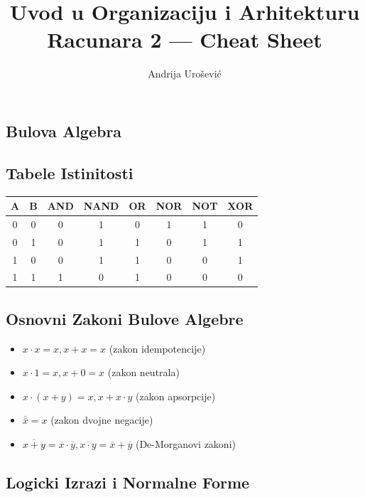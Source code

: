\documentclass[12p,a4paper]{article}
\title{Uvod u Organizaciju i Arhitekturu Racunara 2 --- Cheat Sheet}
\author{Andrija Urošević}
\begin{document}
\maketitle

\begin{multicols}{2}

\section{Bulova Algebra}

    \subsection{Tabele Istinitosti}

    \begin{tabular}{*{8}{c}}
        A & B & AND & NAND & OR & NOR & NOT & XOR \\
        \midrule
        0 & 0 & 0 & 1 & 0 & 1 & 1 & 0 \\
        0 & 1 & 0 & 1 & 1 & 0 & 1 & 1 \\
        1 & 0 & 0 & 1 & 1 & 0 & 0 & 1 \\
        1 & 1 & 1 & 0 & 1 & 0 & 0 & 0 \\
    \end{tabular}

    \subsection{Osnovni Zakoni Bulove Algebre}

    \begin{itemize}
        \itemsep0em
        \item $x \cdot x = x, x + x = x$ (zakon idempotencije)
        \item $x \cdot 1 = x, x + 0 = x$ (zakon neutrala)
        \item $x \cdot (x + y) = x, x + x \cdot y$ (zakon apsorpcije)
        \item $\overline{\overline{x}} = x$ (zakon dvojne negacije)
        \item $\overline{x + y} = \overline{x} \cdot \overline{y},
            \overline{x \cdot y} = \overline{x} + \overline{y}$
            (De-Morganovi zakoni)
    \end{itemize}

    \subsection{Logicki Izrazi i Normalne Forme}


\end{multicols}
\end{document}

